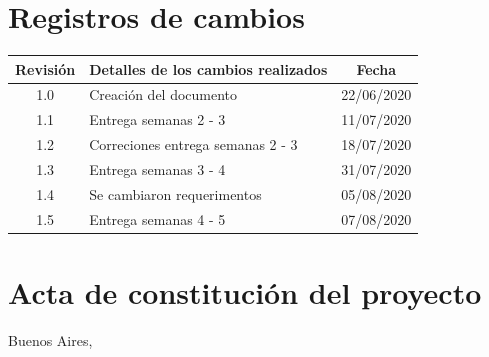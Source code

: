 \documentclass[11pt]{charter}
\begin{document}
\maketitle
\thispagestyle{empty}
\pagebreak


\thispagestyle{empty}
{\setlength{\parskip}{0pt}
\tableofcontents{}
}
\pagebreak


\section{Registros de cambios}
\label{sec:registro}


\begin{table}[ht]
\label{tab:registro}
\centering

\begin{tabularx}{\linewidth}{@{}|c|X|c|@{}}
\hline
\rowcolor[HTML]{C0C0C0} 
\hline
Revisión & \multicolumn{1}{c|}{\cellcolor[HTML]{C0C0C0}Detalles de los cambios realizados} & Fecha      \\ \hline
1.0      & Creación del documento                                                          & 22/06/2020 \\ \hline
1.1      & Entrega semanas 2 - 3                                         & 11/07/2020 \\ 
\hline
1.2      & Correciones entrega semanas 2 - 3 & 18/07/2020  \\
\hline
1.3      & Entrega semanas 3 - 4 & 31/07/2020  \\ \hline
1.4      & Se cambiaron requerimentos & 05/08/2020 \\ \hline
1.5      & Entrega semanas 4 - 5 & 07/08/2020  \\ \hline
\end{tabularx}
\end{table}

\pagebreak



\section{Acta de constitución del proyecto}
\label{sec:acta}

\begin{flushright}
Buenos Aires, \fechaInicioName
\end{flushright}
\end{document}
